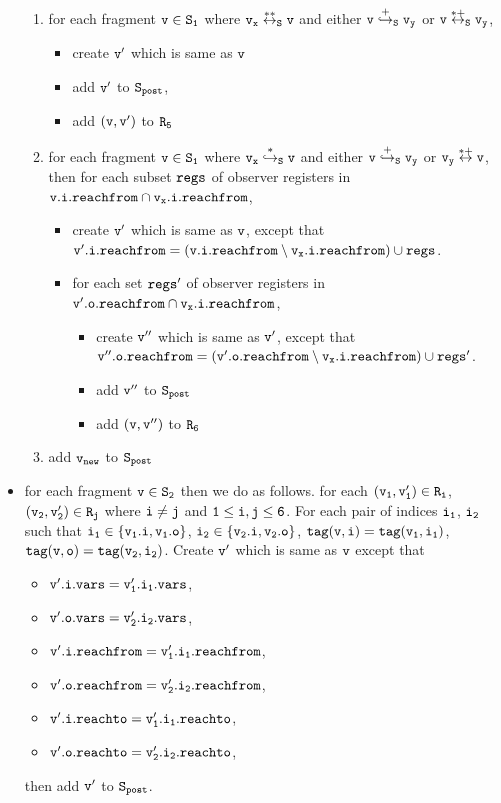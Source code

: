 \begin{itemize}
\begin{enumerate}
\item for each fragment $\tt v \in S_1$ where $\tt v_x \overset{**}\leftrightarrow_S v$ and either $\tt v \overset{+}\hookrightarrow_S v_y$ or $\tt v \overset{*+}\leftrightarrow_S v_y$, 
\begin{itemize}
\item create $\tt v'$ which is same as $\tt v$
\item  add $\tt v'$ to $\tt S_{post}$,
\item add $\tt (v,v')$ to $\tt R_5$

\end{itemize}


\item for each fragment $\tt v \in S_1$ where $\tt v_x \overset{*}\hookrightarrow_S v$ and either $\tt v \overset{+}\hookrightarrow_S v_y$ or $\tt v_y \overset{*+}\leftrightarrow v$, then for each subset $\tt regs$ of observer registers in $\tt v.i.reachfrom \cap \tt v_x.i.reachfrom$, 
\begin{itemize}
\item create $\tt v'$ which is same as $\tt v$, except that $\tt v'.i.reachfrom = (\tt v.i.reachfrom \setminus v_x.i.reachfrom) \cup regs$. 
 \item for each set $\tt regs'$ of observer registers in $\tt v'.o.reachfrom \cap \tt v_x.i.reachfrom$,  
\begin{itemize}
\item create $\tt v''$ which is same as $\tt v'$, except that $\tt v''.o.reachfrom = (\tt v'.o.reachfrom \setminus v_x.i.reachfrom) \cup regs'$. 
\item add $\tt v''$ to $\tt S_{post}$
\item add $\tt (v,v'')$ to $\tt R_6$
\end{itemize}
\end{itemize}
\item add $\tt v_{new}$ to $\tt S_{post}$ 
\end{enumerate}

\item for each fragment $\tt v \in S_2$ then we do as follows. for each $\tt (v_1,v_1') \in R_i$, $\tt (v_2,v_2') \in R_j$ where $\tt i \neq j$ and $\tt 1 \leq i,j \leq 6$. For each pair of indices $\tt i_1$, $\tt i_2$ such that $\tt i_1 \in \{v_1.i, v_1.o\}$, $\tt i_2 \in \{v_2.i, v_2.o\}$, $\tt tag(v,i) = tag(v_1, i_1)$, $\tt tag(v,o) = tag(v_2, i_2)$. Create $\tt v'$ which is same as $\tt v$ except that 
\begin{itemize}
\item $\tt v'.i.vars = v_1'.i_1.vars$,
\item $\tt v'.o.vars = v_2'.i_2.vars$,

\item $\tt v'.i.reachfrom = v_1'.i_1.reachfrom$,
\item $\tt v'.o.reachfrom = v_2'.i_2.reachfrom$,
\item $\tt v'.i.reachto = v_1'.i_1.reachto$,
\item $\tt v'.o.reachto = v_2'.i_2.reachto$,
\end{itemize} then add $\tt v'$ to $\tt S_{post}$. 


\newpage
 \end{itemize}
 
